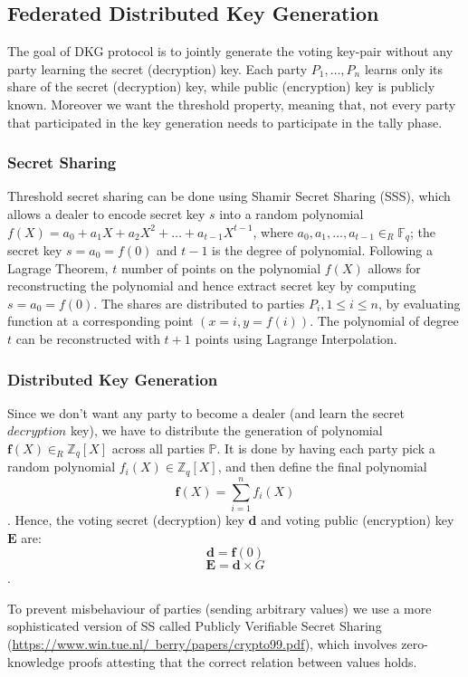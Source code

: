 \documentclass{article}
\begin{document}
\subsection{Federated Distributed Key Generation}
The goal of DKG protocol is to jointly generate the voting key-pair without any party learning the secret (decryption) key. Each party $P_1,\dots,P_n$ learns only its share of the secret (decryption) key, while public (encryption) key is publicly known. Moreover we want the threshold property, meaning that, not every party that participated in the key generation needs to participate in the tally phase.

\subsubsection*{Secret Sharing}

Threshold secret sharing can be done using Shamir Secret Sharing (SSS), which allows a dealer to encode secret key $s$ into a random polynomial $f(X) = a_0 + a_1X + a_2X^2 + \dots + a_{t-1}X^{t-1}$, where $a_0,a_1,\dots,a_{t-1} \in_R \mathbb{F}_q$; the secret key $s=a_0=f(0)$ and $t-1$ is the degree of polynomial. Following a Lagrage Theorem, $t$ number of points on the polynomial $f(X)$ allows for reconstructing the polynomial and hence extract secret key by computing $s = a_0 = f(0)$. The shares are distributed to parties $P_i, 1 \leq i \leq n$, by evaluating function at a corresponding point $(x=i,y=f(i))$. The polynomial of degree $t$ can be reconstructed with $t+1$ points using Lagrange Interpolation.

\subsubsection{Distributed Key Generation}
Since we don't want any party to become a dealer (and learn the secret $decryption$ key), we have to distribute the generation of polynomial $\mathbf{f}(X) \in_R \mathbb{Z}_q[X]$ across all parties $\mathbb{P}$. It is done by having each party pick a random polynomial $f_{i}(X) \in \mathbb{Z}_q[X]$, and then define the final polynomial $$\mathbf{f}(X)=\sum_{i=1}^{n}f_i(X)$$. Hence, the voting secret (decryption) key $\mathbf{d}$ and voting public (encryption) key $\mathbf{E}$ are: $$\mathbf{d}=\mathbf{f}(0)$$ $$\mathbf{E}=\mathbf{d}\times G$$. 

To prevent misbehaviour of parties (sending arbitrary values) we use a more sophisticated version of SS called Publicly Verifiable Secret Sharing (\href{PVSS}{https://www.win.tue.nl/~berry/papers/crypto99.pdf}), which involves zero-knowledge proofs attesting that the correct relation between values holds.
\end{document}
